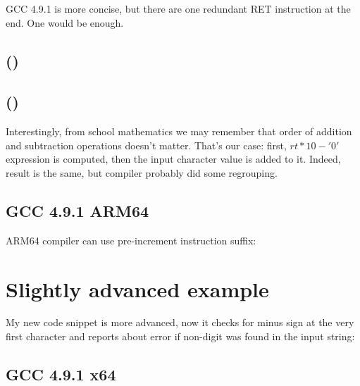 \Optimizing GCC 4.9.1 is more concise, but there are one redundant RET instruction at the end.
One would be enough.



\ifdefined\IncludeARM
\subsection{\OptimizingKeilVI (\ARMMode)}



\subsection{\OptimizingKeilVI (\ThumbMode)}



Interestingly, from school mathematics we may remember that order of addition and 
subtraction operations doesn't matter.
That's our case: first, $rt*10 - '0'$ expression is computed, then the input character value is added
to it.
Indeed, result is the same, but compiler probably did some regrouping.

\subsection{\Optimizing GCC 4.9.1 ARM64}

ARM64 compiler can use pre-increment instruction suffix:


\fi

\section{Slightly advanced example}

My new code snippet is more advanced, now it checks for minus sign at the very first character
and reports about error if non-digit was found in the input string:



\subsection{\Optimizing GCC 4.9.1 x64}

